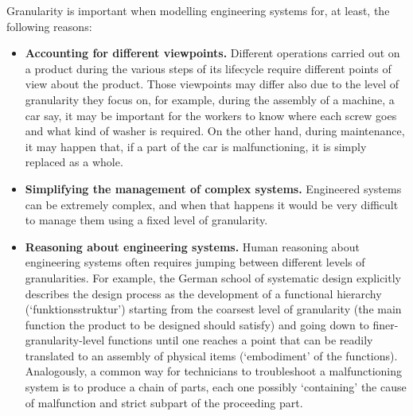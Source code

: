 \documentclass[
]{ceurart}
\begin{document}
Granularity is important when modelling engineering systems for, at least, the following reasons:
\begin{itemize}
    \item \textbf{Accounting for different viewpoints.} Different operations carried out on a product during the various steps of its lifecycle require different points of view about the product. Those viewpoints may differ also due to the level of granularity they focus on, for example, during the assembly of a machine, a car say, it may be important for the workers to know where each screw goes and what kind of washer is required. On the other hand, during maintenance, it may happen that, if a part of the car is malfunctioning, it is simply replaced as a whole.%
    \item \textbf{Simplifying the management of complex systems.} Engineered systems can be extremely complex, and when that happens it would be very difficult to manage them using a fixed level of granularity. %
    \item \textbf{Reasoning about engineering systems.} Human reasoning about engineering systems often requires jumping between different levels of granularities. For example, the German school of systematic design \cite{pahl_engineering_2007} explicitly describes the design process as the development of a functional hierarchy (`funktionsstruktur') starting from the coarsest level of granularity (the main function the product to be designed should satisfy) and going down to finer-granularity-level functions until one reaches a point that can be readily translated to an assembly of physical items (`embodiment' of the functions). Analogously, a common way for technicians to troubleshoot a malfunctioning system is to produce a chain of parts, each one possibly `containing' the cause of malfunction and strict subpart of the proceeding part.%

\end{itemize}
\end{document}
